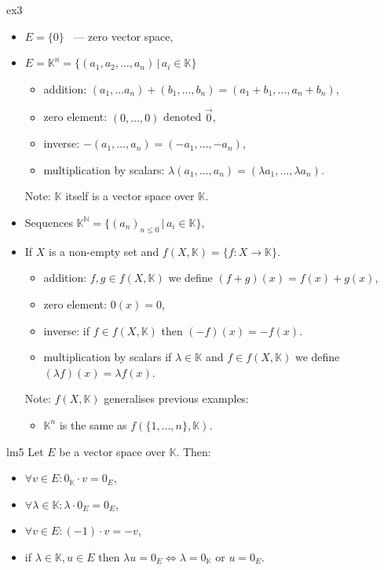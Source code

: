 \documentclass[11pt, a4paper]{article}
\newcommand{\N}{\mathbb{N}}
\newcommand{\K}{\mathbb{K}}
\begin{document}
\begin{example}{}{ex3}
  \begin{itemize}
    \item $E = \{0\}$ ~--- zero vector space,
    \item $E = \K ^n = \{(a_1, a_2, \dots, a_n)\, | \, a_i \in \K \}$
    \begin{itemize}
      \item addition: $(a_1, \dots a_n) + (b_1, \dots, b_n) = (a_1 + b_1, \dots, a_n + b_n)$,
      \item zero element: $(0, \dots, 0)$ denoted $\vec{0}$,
      \item inverse: $-(a_1, \dots, a_n) = (-a_1, \dots, -a_n)$,
      \item multiplication by scalars: $\lambda (a_1, \dots, a_n) = (\lambda a_1, \dots, \lambda a_n)$.
    \end{itemize}

    Note: $\K$ itself is a vector space over $\K$.
    
    \item Sequences $\K ^\N = \{(a_n)_{n \leq 0} \, | \, a_i \in \K\}$,
    \item If $X$ is a non-empty set and $f(X, \K) = \{f: X \longrightarrow \K \}$. 
    \begin{itemize}
      \item addition: $f, g \in f(X, \K)$ we define $(f+g)(x) = f(x) + g(x)$,
      \item zero element: $0(x) = 0$,
      \item inverse: if $f \in f(X, \K)$ then $(-f)(x) = -f(x)$.
      \item multiplication by scalars if $\lambda \in \K$ and $f \in f(X, \K)$ we define $(\lambda f)(x) = \lambda f(x)$.
    \end{itemize}
    
    Note: $f(X, \K)$ generalises previous examples:
    \begin{itemize}
      \item $\K ^ n$ is the same as $f(\{1, \dots, n\}, \K)$.
    \end{itemize}
  \end{itemize}
\end{example}

\begin{lemma}{}{lm5}
  Let $E$ be a vector space over $\K$. Then: 
  \begin{itemize}
    \item $\forall v \in E: 0_{\K} \cdot v = 0_E$,
    \item $\forall \lambda \in \K: \lambda \cdot 0_E = 0_E$,
    \item $\forall v \in E: (-1) \cdot v = -v$,
    \item if $\lambda \in \K, u \in E$ then $\lambda u = 0_E \Leftrightarrow \lambda = 0_\K \text{ or } u = 0_E$.
  \end{itemize}
\end{lemma}
\end{document}
